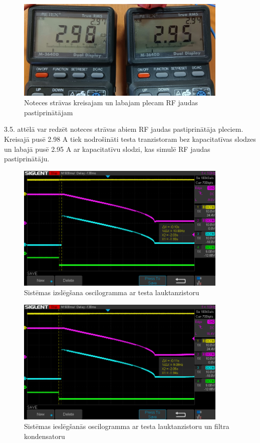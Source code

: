 \begin{figure}[H]
	\centering
    \includegraphics[width=0.9\textwidth]{pictures/load1load2_f.jpg}\hspace{1cm}
    \caption{Noteces strāvas kreisajam un labajam plecam RF jaudas pastiprinātājam}
\end{figure}
3.5. attēlā var redzēt noteces strāvas abiem RF jaudas pastiprinātāja pleciem. Kreisajā pusē 2.98 A tiek nodrošināti testa tranzistoram bez kapacitatīvas slodzes un labajā pusē 2.95 A ar kapacitatīvu slodzi, kas simulē RF jaudas pastiprinātāju.
\begin{figure}[H]
	\centering
    \includegraphics[width=0.9\textwidth]{pictures/load_off_nocap.png}\hspace{1cm}
    \caption{Sistēmas izslēgšana oscilogramma ar testa lauktanzistoru}
\end{figure}
\begin{figure}[H]
	\centering
    \includegraphics[width=0.9\textwidth]{pictures/cap_load_off.png}\hspace{1cm}
    \caption{Sistēmas ieslēgšanās oscilogramma ar testa lauktanzistoru un filtra kondensatoru}
\end{figure}
